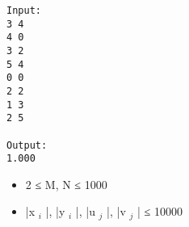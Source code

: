 \begin{verbatim}
Input:
3 4
4 0
3 2
5 4
0 0
2 2
1 3
2 5

Output:
1.000
\end{verbatim}
\begin{itemize}
	\item     2 ≤ M, N ≤ 1000   
	\item     |x    $_     i    $    |, |y    $_     i    $    |, |u    $_     j    $    |, |v    $_     j    $    | ≤ 10000   
\end{itemize}